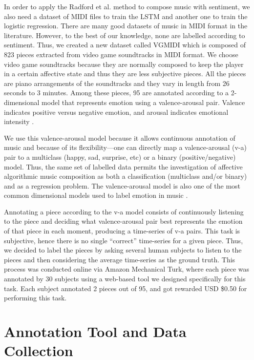 \newcommand{\img}{imgs/ismir19}

In order to apply the Radford et al. \cite{radford_2017} method to compose music with
sentiment, we also need a dataset of MIDI files to train the LSTM and another one
to train the logistic regression. There are many good datasets of music in MIDI format
in the literature. However, to the best of our knowledge, none are labelled according to sentiment. Thus, we created a new
dataset called VGMIDI which is composed of 823 pieces extracted
from video game soundtracks in MIDI format. We choose video game soundtracks
because they are normally composed to keep the player in a certain affective state
and thus they are less subjective pieces. All the pieces are piano
arrangements of the soundtracks and they vary in length  from 26 seconds to 3 minutes.
Among these pieces, 95 are annotated according to a 2-dimensional model
that represents emotion using a valence-arousal pair. Valence indicates
positive versus negative emotion, and arousal indicates emotional intensity \cite{Soleymani_2013}.

We use this valence-arousal model because it allows continuous annotation of music
and because of its flexibility---one can directly map a valence-arousal (v-a) pair to
a multiclass (happy, sad, surprise, etc) or a binary (positive/negative)
model. Thus, the same set of labelled data permits the investigation of affective algorithmic music composition as both a classification
(multiclass and/or binary) and as a regression problem. The valence-arousal model
is also one of the most common dimensional models used to label emotion in music
\cite{Soleymani_2013}.

Annotating a piece according to the v-a model consists of continuously
listening to the piece and deciding what valence-arousal pair best represents the emotion
of that piece in each moment, producing a time-series of v-a pairs.
This task is subjective, hence there is no single ``correct'' time-series for a given
piece. Thus, we decided to label the pieces by asking several human subjects
to listen to the pieces and then considering the average time-series as the ground truth.
This process was conducted online via Amazon Mechanical Turk, where each
piece was annotated by 30 subjects using a web-based tool we designed
specifically for this task. Each subject annotated 2 pieces out of 95,
and got rewarded USD \$0.50 for performing this task.

\section{Annotation Tool and Data Collection}
\label{sec:data_collection}

